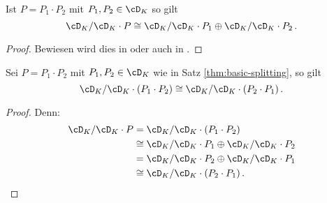 \begin{defcor}
\begin{comment}
\begin{prop}
In der Situation von Lemma \ref{lem:Zyklischer-Vektor} gibt es ein $P\in
\cD_K$ mit $\partial$-Grad von $P$ ist gleich $d$ und $P \cdot m=0$, in
diesem Fall ist $P$ ein Minimalpolynom zu $\cM_K$, also gilt
$\cM_K\cong\cD_K/\cD_K\cdot P$. 
\end{prop}
\begin{proof}
Explizit ergibt sich aus der Basisdarstellung
\begin{align*}
\partial_x^d m&= \alpha_{d-1}\partial_x^{d-1}m + \alpha_{d-2}\partial_x^{d-2}m
  + \cdots + \alpha_1\partial_xm + \alpha_0m & \alpha_i\in K
\end{align*}
von $\partial_x^d m$, dass
\[
\cM_K\cong\cD_K/\cD_K\cdot( \underset{=:Q}{\underbrace{
  \partial^d - \alpha_{d-1}\partial_x^{d-1} - \alpha_{d-2}\partial_x^{d-2} -
  \cdots - \alpha_1\partial_x - \alpha_0 }} )
\]
gilt und damit $P:=Q$ so ein Minimalpolynom ist.
\end{proof}
\end{comment}

\begin{thm}\label{thm:basic-splitting}
Ist $P=P_1\cdot P_2$ mit $P_1,P_2\in \cD_K$ so gilt
\[
\cD_K/\cD_K\cdot P \cong \cD_K/\cD_K\cdot P_1 \oplus \cD_K/\cD_K\cdot P_2 \,.
\]
\end{thm}
\begin{proof}
Bewiesen wird dies in
\cite[Seite 57-64]{ZulaBarbara}
oder auch in \cite[Seite 30-32]{sabbah_cimpa90}.
\end{proof}
\begin{cor} \label{cor:moduluKomutativität}
Sei $P=P_1\cdot P_2$ mit $P_1,P_2\in \cD_K$ wie in Satz
\ref{thm:basic-splitting}, so gilt
\[
\cD_K/\cD_K\cdot (P_1\cdot P_2) \cong \cD_K/\cD_K\cdot (P_2 \cdot P_1) \,.
\]
\end{cor}
\begin{proof} Denn:
\begin{align*}
\cD_K/\cD_K\cdot P &= \cD_K/\cD_K\cdot (P_1\cdot P_2)\\
  &\cong \cD_K/\cD_K\cdot P_1 \oplus \cD_K/\cD_K\cdot P_2\\
  &= \cD_K/\cD_K\cdot P_2 \oplus \cD_K/\cD_K\cdot P_1\\
  &\cong \cD_K/\cD_K\cdot (P_2 \cdot P_1) \,.
\end{align*}
\end{proof}


\end{defcor}
